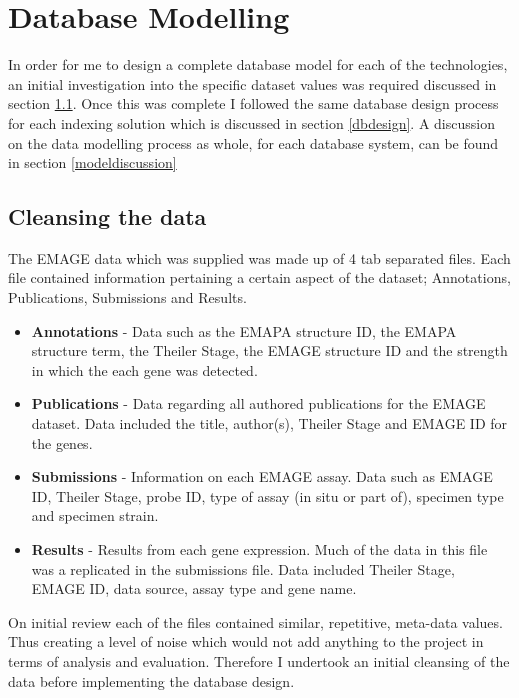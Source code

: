 \chapter{Database Modelling}\label{design}

In order for me to design a complete database model for each of the technologies, an initial investigation into the specific dataset values was required discussed in section \ref{datasetvalues}. Once this was complete I followed the same database design process for each indexing solution which is discussed in section \ref{dbdesign}. A discussion on the data modelling process as whole, for each database system, can be found in section \ref{modeldiscussion}

\section{Cleansing the data}\label{datasetvalues}

The EMAGE data which was supplied was made up of 4 tab separated files. Each file contained information pertaining a certain aspect of the dataset; Annotations, Publications, Submissions and Results.

\begin{itemize}
\item \textbf{Annotations} - Data such as the EMAPA structure ID, the EMAPA structure term, the Theiler Stage, the EMAGE structure ID and the strength in which the each gene was detected.

\item \textbf{Publications} - Data regarding all authored publications for the EMAGE dataset. Data included the title, author(s), Theiler Stage and EMAGE ID for the genes.

\item \textbf{Submissions} - Information on each EMAGE assay. Data such as EMAGE ID, Theiler Stage, probe ID, type of assay (in situ or part of), specimen type and specimen strain.

\item \textbf{Results} - Results from each gene expression. Much of the data in this file was a replicated in the submissions file. Data included Theiler Stage, EMAGE ID, data source, assay type and gene name.
\end{itemize}

On initial review each of the files contained similar, repetitive, meta-data values. Thus creating a level of noise which would not add anything to the project in terms of analysis and evaluation. Therefore I undertook an initial cleansing of the data before implementing the database design.

